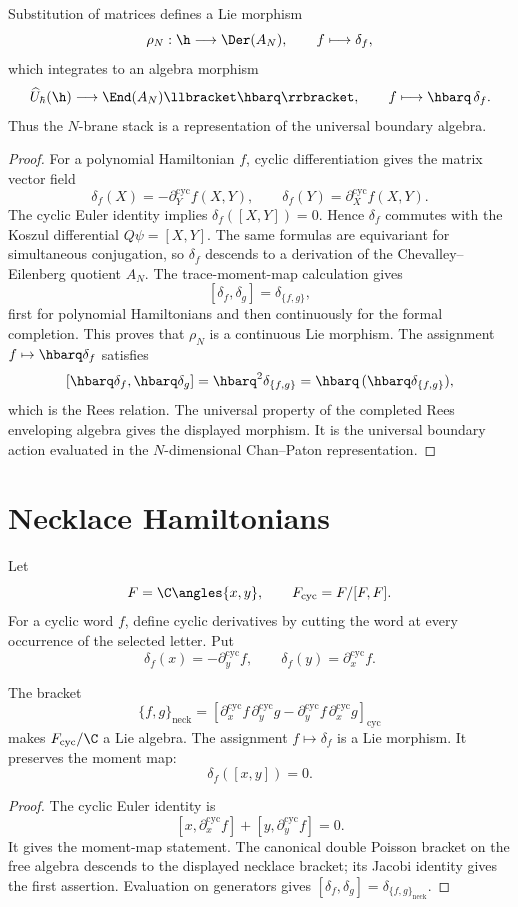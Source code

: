 \begin{proposition}
Substitution of matrices defines a Lie morphism
\[
 \rho_N:\h\longrightarrow\Der(A_N),
 \qquad
 f\longmapsto\delta_f,
\]
which integrates to an algebra morphism
\[
 \widehat U_\hbar(\h)\longrightarrow\End(A_N)\llbracket\hbarq\rrbracket,
 \qquad f\longmapsto\hbarq\,\delta_f.
\]
Thus the $N$-brane stack is a representation of the universal boundary algebra.
\end{proposition}
\begin{proof}
For a polynomial Hamiltonian $f$, cyclic differentiation gives the matrix vector field
\[
 \delta_f(X)=-\partial_Y^{\mathrm{cyc}}f(X,Y),
 \qquad
 \delta_f(Y)=\partial_X^{\mathrm{cyc}}f(X,Y).
\]
The cyclic Euler identity implies $\delta_f([X,Y])=0$.  Hence $\delta_f$ commutes with the Koszul differential $Q\psi=[X,Y]$.  The same formulas are equivariant for simultaneous conjugation, so $\delta_f$ descends to a derivation of the Chevalley--Eilenberg quotient $A_N$.  The trace-moment-map calculation gives
\[
 [\delta_f,\delta_g]=\delta_{\{f,g\}},
\]
first for polynomial Hamiltonians and then continuously for the formal completion.  This proves that $\rho_N$ is a continuous Lie morphism.  The assignment $f\mapsto\hbarq\delta_f$ satisfies
\[
 [\hbarq\delta_f,\hbarq\delta_g]
 =\hbarq^2\delta_{\{f,g\}}
 =\hbarq\,(\hbarq\delta_{\{f,g\}}),
\]
which is the Rees relation.  The universal property of the completed Rees enveloping algebra gives the displayed morphism.  It is the universal boundary action evaluated in the $N$-dimensional Chan--Paton representation.
\end{proof}

\chapter{Necklace Hamiltonians}
Let
\[
 F=\C\angles{x,y},
 \qquad
 F_{\mathrm{cyc}}=F/[F,F].
\]
For a cyclic word $f$, define cyclic derivatives by cutting the word at every occurrence of the selected letter.  Put
\[
 \delta_f(x)=-\partial_y^{\mathrm{cyc}}f,
 \qquad
 \delta_f(y)=\partial_x^{\mathrm{cyc}}f.
\]

\begin{theorem}
The bracket
\[
 \{f,g\}_{\mathrm{neck}}
 =\left[
 \partial_x^{\mathrm{cyc}}f\,
 \partial_y^{\mathrm{cyc}}g-
 \partial_y^{\mathrm{cyc}}f\,
 \partial_x^{\mathrm{cyc}}g
 \right]_{\mathrm{cyc}}
\]
makes $F_{\mathrm{cyc}}/\C$ a Lie algebra.  The assignment $f\mapsto\delta_f$ is a Lie morphism.  It preserves the moment map:
\[
 \delta_f([x,y])=0.
\]
\end{theorem}
\begin{proof}
The cyclic Euler identity is
\[
 [x,\partial_x^{\mathrm{cyc}}f]+[y,\partial_y^{\mathrm{cyc}}f]=0.
\]
It gives the moment-map statement.  The canonical double Poisson bracket on the free algebra descends to the displayed necklace bracket; its Jacobi identity gives the first assertion.  Evaluation on generators gives $[\delta_f,\delta_g]=\delta_{\{f,g\}_{\mathrm{neck}}}$.
\end{proof}

